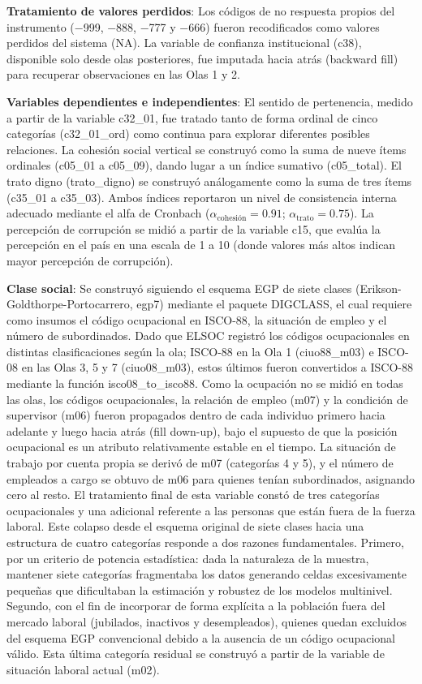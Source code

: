 \documentclass[
  spanish,
  a4paper,
  oneside]{scrbook}
\begin{document}
\textbf{Tratamiento de valores perdidos}: Los códigos de no respuesta
propios del instrumento (−999, −888, −777 y −666) fueron recodificados
como valores perdidos del sistema (NA). La variable de confianza
institucional (c38), disponible solo desde olas posteriores, fue
imputada hacia atrás (backward fill) para recuperar observaciones en las
Olas 1 y 2.

\textbf{Variables dependientes e independientes}: El sentido de
pertenencia, medido a partir de la variable c32\_01, fue tratado tanto
de forma ordinal de cinco categorías (c32\_01\_ord) como continua para
explorar diferentes posibles relaciones. La cohesión social vertical se
construyó como la suma de nueve ítems ordinales (c05\_01 a c05\_09),
dando lugar a un índice sumativo (c05\_total). El trato digno
(trato\_digno) se construyó análogamente como la suma de tres ítems
(c35\_01 a c35\_03). Ambos índices reportaron un nivel de consistencia
interna adecuado mediante el alfa de Cronbach
(\(\alpha_{\text{cohesión}} = 0.91\); \(\alpha_{\text{trato}} = 0.75\)).
La percepción de corrupción se midió a partir de la variable c15, que
evalúa la percepción en el país en una escala de 1 a 10 (donde valores
más altos indican mayor percepción de corrupción).

\textbf{Clase social}: Se construyó siguiendo el esquema EGP de siete
clases (Erikson-Goldthorpe-Portocarrero, egp7) mediante el paquete
DIGCLASS, el cual requiere como insumos el código ocupacional en
ISCO-88, la situación de empleo y el número de subordinados. Dado que
ELSOC registró los códigos ocupacionales en distintas clasificaciones
según la ola; ISCO-88 en la Ola 1 (ciuo88\_m03) e ISCO-08 en las Olas 3,
5 y 7 (ciuo08\_m03), estos últimos fueron convertidos a ISCO-88 mediante
la función isco08\_to\_isco88. Como la ocupación no se midió en todas
las olas, los códigos ocupacionales, la relación de empleo (m07) y la
condición de supervisor (m06) fueron propagados dentro de cada individuo
primero hacia adelante y luego hacia atrás (fill down-up), bajo el
supuesto de que la posición ocupacional es un atributo relativamente
estable en el tiempo. La situación de trabajo por cuenta propia se
derivó de m07 (categorías 4 y 5), y el número de empleados a cargo se
obtuvo de m06 para quienes tenían subordinados, asignando cero al resto.
El tratamiento final de esta variable constó de tres categorías
ocupacionales y una adicional referente a las personas que están fuera
de la fuerza laboral. Este colapso desde el esquema original de siete
clases hacia una estructura de cuatro categorías responde a dos razones
fundamentales. Primero, por un criterio de potencia estadística: dada la
naturaleza de la muestra, mantener siete categorías fragmentaba los
datos generando celdas excesivamente pequeñas que dificultaban la
estimación y robustez de los modelos multinivel. Segundo, con el fin de
incorporar de forma explícita a la población fuera del mercado laboral
(jubilados, inactivos y desempleados), quienes quedan excluidos del
esquema EGP convencional debido a la ausencia de un código ocupacional
válido. Esta última categoría residual se construyó a partir de la
variable de situación laboral actual (m02).
\end{document}
